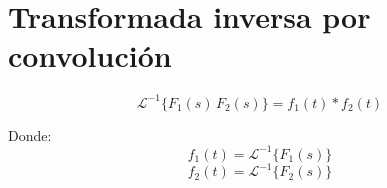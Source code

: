 \section{Transformada inversa por convolución}
\begin{equation}
    \mathcal{L}^{-1}\{F_1(s)\,F_2(s)\}=f_1(t)*f_2(t)
\end{equation}

Donde:
\begin{equation*}
    f_1(t)=\mathcal{L}^{-1}\{F_1(s)\}
\end{equation*}
\begin{equation*}
    f_2(t)=\mathcal{L}^{-1}\{F_2(s)\}
\end{equation*}

